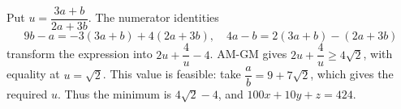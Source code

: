 Put $u=\dfrac{3a+b}{2a+3b}$. The numerator identities
\[
9b-a=-3(3a+b)+4(2a+3b),\quad
4a-b=2(3a+b)-(2a+3b)
\]
transform the expression into $2u+\dfrac{4}{u}-4$. AM-GM gives $2u+\dfrac{4}{u}\ge4\sqrt2$, with equality at $u=\sqrt2$. This value is feasible: take $\dfrac{a}{b}=9+7\sqrt2$, which gives the required $u$.
Thus the minimum is $4\sqrt2-4$, and $\boxed{100x+10y+z=424}$.
